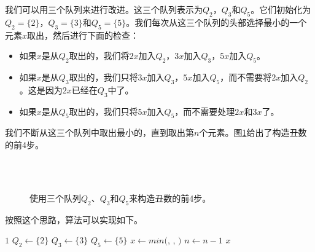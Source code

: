 \documentclass[UTF8]{article}
\begin{document}
我们可以用三个队列来进行改进。这三个队列表示为$Q_2$，$Q_3$和$Q_5$。它们初始化为$Q_2=\{ 2 \}$，$Q_3 = \{ 3\}$和$Q_5 = \{ 5 \}$。我们每次从这三个队列的头部选择最小的一个元素$x$取出，然后进行下面的检查：

\begin{itemize}
\item 如果$x$是从$Q_2$取出的，我们将$2x$加入$Q_2$，$3x$加入$Q_3$，$5x$加入$Q_5$。
\item 如果$x$是从$Q_3$取出的，我们只将$3x$加入$Q_3$，$5x$加入$Q_5$，而不需要将$2x$加入$Q_2$。这是因为$2x$已经在$Q_3$中了。
\item 如果$x$是从$Q_5$取出的，我们只将$5x$加入$Q_5$，而不需要处理$2x$和$3x$了。
\end{itemize}

我们不断从这三个队列中取出最小的，直到取出第$n$个元素。图\ref{fig:q235}给出了构造丑数的前4步。

\begin{figure}[htbp]
  \renewcommand*\thesubfigure{\arabic{subfigure}}
  \centering
   \\
   \\
  \caption{使用三个队列$Q_2$、$Q_3$和$Q_5$来构造丑数的前4步。}
  \label{fig:q235}
\end{figure}

按照这个思路，算法可以实现如下。

\begin{algorithmic}[1]
    \State \Return $1$
  \Else
    \State $Q_2 \gets \{ 2 \}$
    \State $Q_3 \gets \{ 3 \}$
    \State $Q_5 \gets \{ 5 \}$
      \State $x \gets min($, , $)$
        \State {}
        \State {}
        \State {}
        \State {}
        \State {}
        \State {}
        \State {}
      \Else
        \State {}
        \State {}
      \EndIf
      \State $n \gets n - 1$
    \EndWhile
    \State \Return $x$
  \EndIf
\EndFunction
\end{algorithmic}
\end{document}
